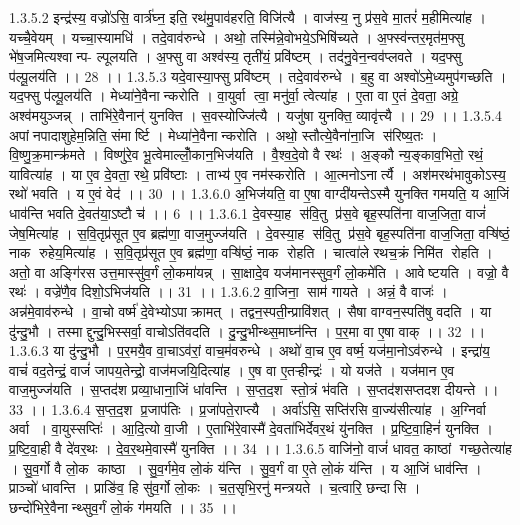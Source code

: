 1.3.5.2
इन्द्र॑स्य॒ वज्रो॑ऽसि॒ वार्त्र॑घ्न॒ इति॒ रथ॑मु॒पाव॑हरति॒ विजि॑त्यै । वाज॑स्य॒ नु प्र॑स॒वे मा॒तरं॑ म॒हीमित्या॑ह । यच्चै॒वेयम् । यच्चा॒स्यामधि॑ । तदे॒वाव॑रुन्धे । अथो॒ तस्मि॑न्ने॒वोभये॒ऽभिषि॑च्यते । अ॒फ्स्व॑न्तर॒मृत॑म॒फ्सु भे॑ष॒जमित्यश्वान्प- ल्पूलयति । अ॒फ्सु वा अश्व॑स्य॒ तृती॑यं॒ प्रवि॑ष्टम् । तद॑नु॒वेन॒न्वव॑प्लवते । यद॒फ्सु प॑ल्पू॒लय॑ति ।। 28 ।।
1.3.5.3
यदे॒वास्या॒फ्सु प्रवि॑ष्टम् । तदे॒वाव॑रुन्धे । ब॒हु वा अश्वो॑ऽमे॒ध्यमुप॑गच्छति । यद॒फ्सु प॑ल्पू॒लय॑ति । मेध्या॑ने॒वैनान्करोति । वा॒युर्वा त्वा॒ मनु॑र्वा॒ त्वेत्या॑ह । ए॒ता वा ए॒तं दे॒वता॒ अग्रे॒ अश्व॑मयुञ्जन्न् । ताभि॑रे॒वैनान्॑ युनक्ति । स॒वस्योज्जि॑त्यै । यजु॑षा युनक्ति॒ व्यावृ॑त्त्यै ।। 29 ।।
1.3.5.4
अपांनपादाशुहेम॒न्निति॒ संमार्ष्टि । मेध्या॑ने॒वैनान्करोति । अथो॒ स्तौत्ये॒वैना॑ना॒जि स॑रिष्य॒तः । वि॒ष्णु॒क्र॒मान्क्र॑मते । विष्णु॑रे॒व भू॒त्वेमाल्लोँ॒कान॒भिज॑यति । वै॒श्व॒दे॒वो वै रथः॑ । अ॒ङ्कौ न्य॒ङ्काव॒भितो॒ रथं॒ यावित्या॑ह । या ए॒व दे॒वता॒ रथे॒ प्रवि॑ष्टाः । ताभ्य॑ ए॒व नम॑स्करोति । आ॒त्मनोऽनार्त्यै । अश॑मरथंभावुकोऽस्य॒ रथो॑ भवति । य ए॒वं वेद॑ ।। 30 ।।
1.3.6.0
अ॒भिज॑यति॒ वा ए॒षा वाग्दी॑यन्तेऽस्मै युनक्ति गमयति॒ य आ॒जिं धाव॑न्ति भवति दे॒वत॑या॒ऽष्टौ च॑ ।। 6 ।।
1.3.6.1
दे॒वस्या॒ह स॑वि॒तु प्र॑स॒वे बृह॒स्पति॑ना वाज॒जिता॒ वाजं॑ जेष॒मित्या॑ह । स॒वि॒तृप्र॑सूत ए॒व ब्रह्म॑णा॒ वाज॒मुज्ज॑यति । दे॒वस्या॒ह स॑वि॒तु प्र॑स॒वे बृह॒स्पति॑ना वाज॒जिता॒ वऱ्षि॑ष्ठं॒ नाक॑ रुहेय॒मित्या॑ह । स॒वि॒तृप्र॑सूत ए॒व ब्रह्म॑णा॒ वऱ्षि॑ष्ठं॒ नाक॑ रोहति । चात्वा॑ले रथच॒क्रं निमि॑त रोहति । अतो॒ वा अङ्गि॑रस उत्त॒मास्सु॑व॒र्गं लो॒कमा॑यन्न् । सा॒क्षादे॒व यज॑मानस्सुव॒र्गं लो॒कमे॑ति । आवेष्टयति । वज्रो॒ वै रथः॑ । वज्रे॑णै॒व दिशो॒ऽभिज॑यति ।। 31 ।।
1.3.6.2
वा॒जिना॒॒ साम॑ गायते । अन्नं॒ वै वाजः॑ । अन्न॑मे॒वाव॑रुन्धे । वा॒चो वर्ष्म॑ दे॒वेभ्योऽपाक्रामत् । तद्वन॒स्पती॒न्प्रावि॑शत् । सैषा वाग्वन॒स्पति॑षु वदति । या दु॑न्दु॒भौ । तस्माद्दुन्दु॒भिस्सर्वा॒ वाचोऽति॑वदति । दु॒न्दु॒भीन्थ्स॒माघ्न॑न्ति । प॒र॒मा वा ए॒षा वाक् ।। 32 ।।
1.3.6.3
या दु॑न्दु॒भौ । प॒र॒मयै॒व वा॒चाऽव॑रां॒ वाच॒म॑वरुन्धे । अथो॑ वा॒च ए॒व वर्ष्म॒ यज॑मा॒नोऽव॑रुन्धे । इन्द्रा॑य॒ वाचं॑ वद॒तेन्द्रं॒ वाजं॑ जापय॒तेन्द्रो॒ वाज॑मजयि॒दित्या॑ह । ए॒ष वा ए॒तऱ्हीन्द्रः॑ । यो यज॑ते । यज॑मान ए॒व वाज॒मुज्ज॑यति । स॒प्तद॑श प्रव्या॒धाना॒जिं धा॑वन्ति । स॒प्त॒द॒श स्तो॒त्रं भ॑वति । स॒प्तद॑शसप्तदश दीयन्ते ।। 33 ।।
1.3.6.4
स॒प्त॒द॒श प्र॒जाप॑तिः । प्र॒जा॑पते॒राप्त्यै । अर्वा॑ऽसि॒ सप्ति॑रसि वा॒ज्य॑सीत्या॑ह । अ॒ग्निर्वा अर्वा । वा॒युस्सप्तिः॑ । आ॒दि॒त्यो वा॒जी । ए॒ताभि॑रे॒वास्मै॑ दे॒वता॑भिर्देवर॒थं यु॑नक्ति । प्र॒ष्टि॒वा॒हिनं॑ युनक्ति । प्र॒ष्टि॒वा॒ही वै दे॑वर॒थः । दे॒व॒र॒थमे॒वास्मै॑ युनक्ति ।। 34 ।।
1.3.6.5
वाजि॑नो॒ वाजं॑ धावत॒ काष्ठां गच्छ॒तेत्या॑ह । सु॒व॒र्गो वै लो॒क काष्ठा । सु॒व॒र्गमे॒व लो॒कं य॑न्ति । सु॒व॒र्गं वा ए॒ते लो॒कं य॑न्ति । य आ॒जिं धाव॑न्ति । प्राञ्चो॑ धावन्ति । प्राङि॑व॒ हि सु॑व॒र्गो लो॒कः । च॒त॒सृभि॒रनु॑ मन्त्रयते । च॒त्वारि॒ छन्दा॑सि । छन्दो॑भिरे॒वैनान्थ्सुव॒र्गं लो॒कं ग॑मयति ।। 35 ।।
